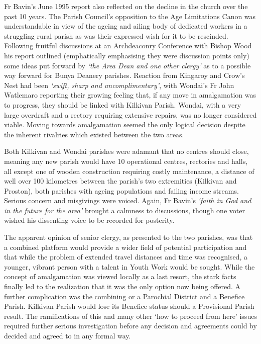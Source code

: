 Fr Bavin's June 1995 report also reflected on the decline in the church over the past 10 years. The Parish Council's opposition to the Age Limitations Canon was understandable in view of the ageing and ailing body of dedicated workers in a struggling rural parish as was their expressed wish for it to be rescinded. Following fruitful discussions at an Archdeaconry Conference with Bishop Wood his report outlined (emphatically emphasising they were discussion points only) some ideas put forward by \emph{`the Area Dean and one other clergy'} as to a possible way forward for Bunya Deanery parishes. Reaction from Kingaroy and Crow's Nest had been \emph{`swift, sharp and uncomplimentary'}, with Wondai's Fr John Watlemaro reporting their growing feeling that, if any move in amalgamation was to progress, they should be linked with Kilkivan Parish. Wondai, with a very large overdraft and a rectory requiring extensive repairs, was no longer considered viable. Moving towards amalgamation seemed the only logical decision despite the inherent rivalries which existed between the two areas.

Both Kilkivan and Wondai parishes were adamant that no centres should close, meaning any new parish would have 10 operational centres, rectories and halls, all except one of wooden construction requiring costly maintenance, a distance of well over 100 kilometres between the parish's two extremities (Kilkivan and Proston), both parishes with ageing populations and failing income streams. Serious concern and misgivings were voiced. Again, Fr Bavin's \emph{`faith in God and in the future for the area'} brought a calmness to discussions, though one voter wished his dissenting voice to be recorded for posterity.

The apparent opinion of senior clergy, as presented to the two parishes, was that a combined platform would provide a wider field of potential participation and that while the problem of extended travel distances and time was recognised, a younger, vibrant person with a talent in Youth Work would be sought. While the concept of amalgamation was viewed locally as a last resort, the stark facts finally led to the realization that it was the only option now being offered. A further complication was the combining or a Parochial District and a Benefice Parish. Kilkivan Parish would lose its Benefice status should a Provisional Parish result. The ramifications of this and many other `how to proceed from here' issues required further serious investigation before any decision and agreements could by decided and agreed to in any formal way.

